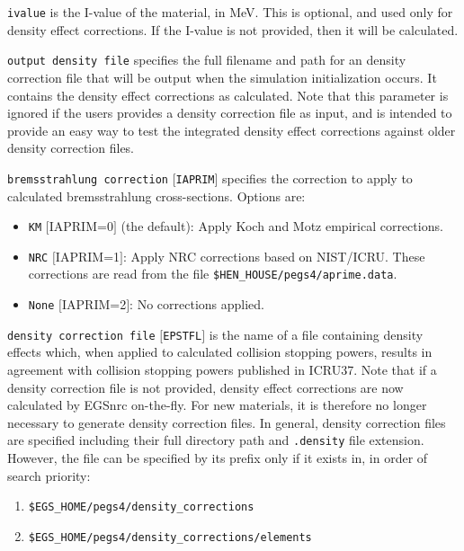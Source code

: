 \begin{description}
\begin{description}
\item {\tt ivalue} is the I-value of the material, in MeV. This is optional, and used only for density effect corrections. If the I-value is not provided, then it will be calculated.
\item {\tt output density file} specifies the full filename and path for an density correction file that will be output when the simulation initialization occurs. It contains the density effect corrections as calculated. Note that this parameter is ignored if the users provides a density correction file as input, and is intended to provide an easy way to test the integrated density effect corrections against older density correction files.
\item {\tt bremsstrahlung correction} $[${\tt IAPRIM}$]$ specifies the
correction to apply to calculated bremsstrahlung cross-sections.
Options are:
\begin{itemize}
\item {\tt KM} $[$IAPRIM=0$]$ (the default): Apply Koch and Motz\cite{KM59} empirical corrections.
\item {\tt NRC} $[$IAPRIM=1$]$: Apply NRC corrections based on NIST/ICRU\cite{Ro89a}.  These corrections are read from the file
{\tt \$HEN\_HOUSE/pegs4/aprime.data}.
\item {\tt None} $[$IAPRIM=2$]$: No corrections applied.
\end{itemize}
\item {\tt density correction file} $[${\tt EPSTFL}$]$ is the name of a file containing density effects which, when applied to calculated collision
stopping powers, results in agreement with collision stopping powers published in ICRU37\cite{ICRU37}.
Note that if a density correction file is not provided, density effect corrections are now calculated by EGSnrc on-the-fly. For new materials, it is therefore no longer necessary to generate density correction files.
In general, density correction files are specified including their full directory path and {\tt .density} file extension.  However,
the file can be specified by its prefix only if it
exists in, in order of search priority:
\begin{enumerate}
\item {\tt \$EGS\_HOME/pegs4/density\_corrections}
\item {\tt \$EGS\_HOME/pegs4/density\_corrections/elements}

\end{enumerate}
\end{description}
\end{description}
